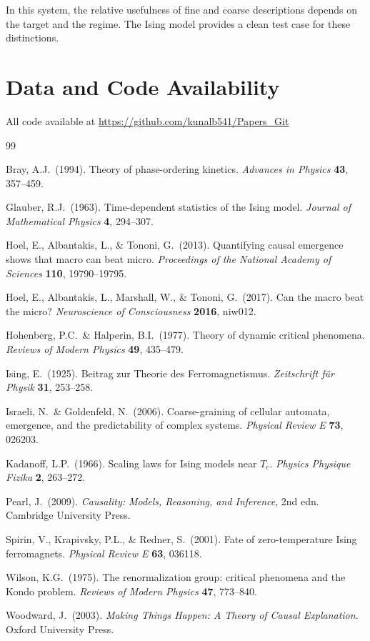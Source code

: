 \documentclass[11pt,a4paper]{article}
\begin{document}
In this system, the relative usefulness of fine and coarse descriptions
depends on the target and the regime.
The Ising model provides a clean test case for these distinctions.

\section*{Data and Code Availability}

All code available at \url{https://github.com/kunalb541/Papers_Git}

\begin{thebibliography}{99}

Bray, A.J.\ (1994).
Theory of phase-ordering kinetics.
\textit{Advances in Physics} \textbf{43}, 357--459.

Glauber, R.J.\ (1963).
Time-dependent statistics of the Ising model.
\textit{Journal of Mathematical Physics} \textbf{4}, 294--307.

Hoel, E., Albantakis, L., \& Tononi, G.\ (2013).
Quantifying causal emergence shows that macro can beat micro.
\textit{Proceedings of the National Academy of Sciences} \textbf{110}, 19790--19795.

Hoel, E., Albantakis, L., Marshall, W., \& Tononi, G.\ (2017).
Can the macro beat the micro?
\textit{Neuroscience of Consciousness} \textbf{2016}, niw012.

Hohenberg, P.C.\ \& Halperin, B.I.\ (1977).
Theory of dynamic critical phenomena.
\textit{Reviews of Modern Physics} \textbf{49}, 435--479.

Ising, E.\ (1925).
Beitrag zur Theorie des Ferromagnetismus.
\textit{Zeitschrift f{\"u}r Physik} \textbf{31}, 253--258.

Israeli, N.\ \& Goldenfeld, N.\ (2006).
Coarse-graining of cellular automata, emergence, and the predictability of complex systems.
\textit{Physical Review E} \textbf{73}, 026203.

Kadanoff, L.P.\ (1966).
Scaling laws for Ising models near $T_c$.
\textit{Physics Physique Fizika} \textbf{2}, 263--272.

Pearl, J.\ (2009).
\textit{Causality: Models, Reasoning, and Inference}, 2nd edn.
Cambridge University Press.

Spirin, V., Krapivsky, P.L., \& Redner, S.\ (2001).
Fate of zero-temperature Ising ferromagnets.
\textit{Physical Review E} \textbf{63}, 036118.

Wilson, K.G.\ (1975).
The renormalization group: critical phenomena and the Kondo problem.
\textit{Reviews of Modern Physics} \textbf{47}, 773--840.

Woodward, J.\ (2003).
\textit{Making Things Happen: A Theory of Causal Explanation}.
Oxford University Press.

\end{thebibliography}
\end{document}
